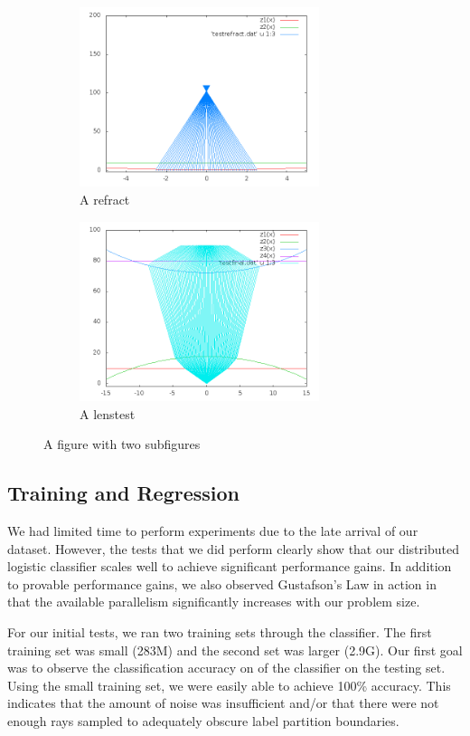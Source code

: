 \begin{figure}
\centering
\begin{subfigure}{.5\textwidth}
  \centering
  \includegraphics[width=7cm]{out4.png}
  \caption{A refract}
  \label{fig:sub3}
\end{subfigure}%
\begin{subfigure}{.5\textwidth}
  \centering
  \includegraphics[width=7cm]{out5.png}
  \caption{A lenstest}
  \label{fig:sub4}
\end{subfigure}
\caption{A figure with two subfigures}
\label{fig:test2}
\end{figure}



\subsection{Training and Regression}

We had limited time to perform experiments due to the late arrival of our dataset.  However, the tests that we did perform clearly show that our distributed logistic classifier scales well to achieve significant performance gains.  In addition to provable performance gains, we also observed Gustafson's Law in action in that the available parallelism significantly increases with our problem size.

For our initial tests, we ran two training sets through the classifier.  The first training set was small (283M) and the second set was larger (2.9G).  Our first goal was to observe the classification accuracy on of the classifier on the testing set.  Using the small training set, we were easily able to achieve 100\% accuracy.  This indicates that the amount of noise was insufficient and/or that there were not enough rays sampled to adequately obscure label partition boundaries.

